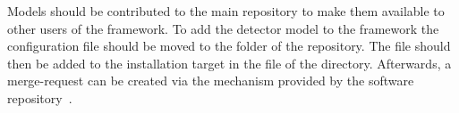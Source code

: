 Models should be contributed to the main repository to make them available to other users of the framework.
To add the detector model to the framework the configuration file should be moved to the  folder of the repository.
The file should then be added to the installation target in the  file of the  directory.
Afterwards, a merge-request can be created via the mechanism provided by the software repository~\cite{ap2-repo}.
